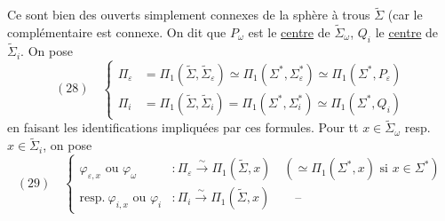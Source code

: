 Ce sont bien des ouverts   simplement connexes de la sphère à trous $\widetilde\Sigma$ (car le complémentaire est connexe. On dit que $P_\omega$ est le \uline{centre} de $\widetilde\Sigma_\omega$, $Q_i$ le \uline{centre} de $\widetilde\Sigma_i$.
On pose
\[
(28)\quad\left\{\begin{aligned}
\Pi_\varepsilon&=\Pi_1(\widetilde\Sigma,\widetilde\Sigma_\varepsilon)\simeq\Pi_1(\Sigma^*,\Sigma_\varepsilon^*)\simeq\Pi_1(\Sigma^*,P_\varepsilon)\\
\Pi_i&=\Pi_1(\widetilde\Sigma,\widetilde\Sigma_i)=\Pi_1(\Sigma^*,\Sigma_i^*)\simeq\Pi_1(\Sigma^*,Q_i)
\end{aligned}\right.
\]
en faisant les identifications impliquées par ces formules.  Pour tt $x\in\widetilde\Sigma_\omega$ resp. $x\in\widetilde\Sigma_i$, on pose
\[
(29)\quad\left\{\begin{aligned}
\varphi_{\varepsilon,x}\text{ ou }\varphi_\omega&:\Pi_\varepsilon\xrightarrow{\sim}\Pi_1(\widetilde\Sigma,x)\quad(\simeq\Pi_1(\Sigma^*,x)\text{ si }x\in\Sigma^*)\\
\text{resp.}\ \varphi_{i,x}\text{ ou }\varphi_i&:\Pi_i\xrightarrow{\sim}\Pi_1(\widetilde\Sigma,x)\qquad\text{--}
\end{aligned}\right.
\]

